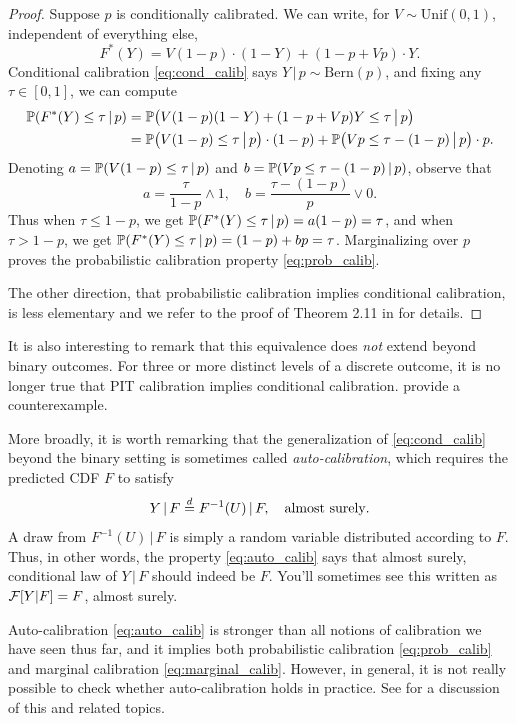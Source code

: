 \documentclass{article}
\begin{document}
\begin{proof}
Suppose $p$ is conditionally calibrated. We can write, for $V \sim
\mathrm{Unif}(0,1)$, independent of everything else,    
\[
F^*(Y) = V (1-p) \cdot (1-Y) + (1-p + V p) \cdot Y.
\]
Conditional calibration \eqref{eq:cond_calib} says $Y\,|\,p \sim
\mathrm{Bern}(p)$, and fixing any $\tau \in [0,1]$, we can compute
\begin{align*}
\P(F^*(Y) \leq \tau \,|\, p) 
&= \P\big( V (1-p) (1-Y) + (1-p + V p) Y \leq \tau \,\big|\, p \big) \\ 
&= \P\big( V (1-p) \leq \tau \,\big|\, p \big) \cdot (1-p) + \P\big( V p \leq   
  \tau-(1-p) \,\big|\, p \big) \cdot p. 
\end{align*}
Denoting $a = \P(V (1-p) \leq \tau \,|\, p)$ and $b = \P(V p \leq \tau-(1-p)
\,|\, p)$, observe that
\[
a = \frac{\tau}{1-p} \wedge 1, 
\quad
b = \frac{\tau-(1-p)}{p} \vee 0.
\]
Thus when $\tau \leq 1-p$, we get $\P(F^*(Y) \leq \tau \,|\, p) = a(1-p) =
\tau$, and when $\tau > 1-p$, we get $\P(F^*(Y) \leq \tau \,|\, p) = (1-p) + bp
= \tau$. Marginalizing over $p$ proves the probabilistic calibration property
\eqref{eq:prob_calib}.

The other direction, that probabilistic calibration implies conditional
calibration, is less elementary and we refer to the proof of Theorem 2.11 in
\citet{gneiting2013combining} for details. 
\end{proof}

It is also interesting to remark that this equivalence does \emph{not} extend
beyond binary outcomes. For three or more distinct levels of a discrete outcome,
it is no longer true that PIT calibration implies conditional
calibration. \citet{gneiting2022regression} provide a counterexample.  

More broadly, it is worth remarking that the generalization of
\eqref{eq:cond_calib} beyond the binary setting is sometimes called
\emph{auto-calibration}, which requires the predicted CDF $F$ to satisfy  
\begin{equation}  
\label{eq:auto_calib}
Y \,|\, F \deq F^{-1}(U) \,|\, F, \quad \text{almost surely}.   
\end{equation}
A draw from $F^{-1}(U) \,|\, F$ is simply a random variable distributed
according to $F$. Thus, in other words, the property \eqref{eq:auto_calib} says
that almost surely, conditional law of $Y \,|\, F$ should indeed be $F$. You'll 
sometimes see this written as $\cF[Y|F] = F$, almost surely. 

Auto-calibration \eqref{eq:auto_calib} is stronger than all notions of
calibration we have seen thus far, and it implies both probabilistic calibration
\eqref{eq:prob_calib} and marginal calibration
\eqref{eq:marginal_calib}. However, in general, it is not really possible to
check whether auto-calibration holds in practice. See
\citet{gneiting2022regression} for a discussion of this and related topics.
\end{document}
